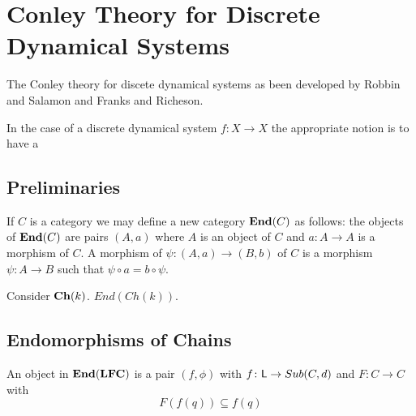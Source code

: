 
\section{Conley Theory for Discrete Dynamical Systems}\label{sec:maps}

The Conley theory for discete dynamical systems as been developed by Robbin and Salamon and Franks and Richeson.

In the case of a discrete dynamical system $f:X\to X$ the appropriate notion is to have a 


\subsection{Preliminaries}
If $C$ is a category we may define a new category ${\bf End}(C)$ as follows: the objects of ${\bf End}(C)$ are pairs $(A,a)$ where $A$ is an object of $C$ and $a\colon A\to A$ is a morphism of $C$.  A morphism of $\psi\colon (A,a)\to (B,b)$ of $C$ is a morphism $\psi\colon A\to B$ such that $\psi\circ a = b\circ \psi$.

\begin{ex}
Consider ${\bf Ch}(k)$.  $End(Ch(k))$.
\end{ex}



\subsection{Endomorphisms of Chains}


An object in ${\bf End}({\bf LFC})$ is a pair $(f,\phi)$ with $f\colon {\mathsf L}\to Sub(C,d)$ and $F\colon C\to C$ with 
\[
F(f(q))\subseteq f(q)
\]

